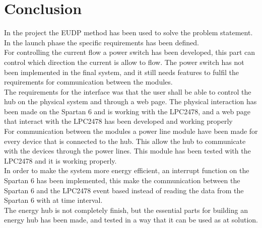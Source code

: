 \chapter{Conclusion}
%
In the project the EUDP method has been used to solve the problem statement. In the launch phase the specific requirements has been defined.\\
For controlling the current flow a power switch has been developed, this part can control which direction the current is allow to flow. The power switch has not been implemented in the final system, and it still needs features to fulfil the requirements for communication between the modules.\\
The requirements for the interface was that the user shall be able to control the hub on the physical system and through a web page. The physical interaction has been made on the Spartan 6 and is working with the LPC2478, and a web page that interact with the LPC2478 has been developed and working properly\\
For communication between the modules a power line module have been made for every device that is connected to the hub. This allow the hub to communicate with the devices through the power lines. This module has been tested with the LPC2478 and it is working properly.\\
In order to make the system more energy efficient, an interrupt function on the Spartan 6 has been implemented, this make the communication between the Spartan 6 and the LPC2478 event based instead of reading the data from the Spartan 6 with at time interval.\\
The energy hub is not completely finish, but the essential parts for building an energy hub has been made, and tested in a way that it can be used as at solution.

